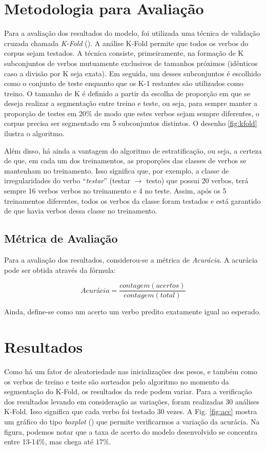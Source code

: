 \section{Metodologia para Avaliação}
\label{sec:method}

 Para a avaliação dos resultados do modelo, foi utilizada uma técnica de validação cruzada chamada \textit{K-Fold} (\cite{kfold:2018}). A análise K-Fold permite que todos os verbos do corpus sejam testados. A técnica consiste, primeiramente, na formação de K subconjuntos de verbos mutuamente exclusivos de tamanhos próximos (idênticos caso a divisão por K seja exata). Em seguida, um desses subconjuntos é escolhido como o conjunto de teste enquanto que os K-1 restantes são utilizados como treino. O tamanho de K é definido a partir da escolha de proporção em que se deseja realizar a segmentação entre treino e teste, ou seja, para sempre manter a proporção de testes em 20\% de modo que estes verbos sejam sempre diferentes, o corpus precisa ser segmentado em 5 subconjuntos distintos. O desenho \ref{fig:kfold} ilustra o algoritmo. 



Além disso, há ainda a vantagem do algoritmo de estratificação, ou seja, a certeza de que, em cada um dos treinamentos, as proporções das classes de verbos se mantenham no treinamento. Isso significa que, por exemplo, a classe de irregularidades do verbo “\textit{testar}” (testar $\rightarrow$ testo) que possui 20 verbos, terá sempre 16 verbos verbos no treinamento e 4 no teste. Assim, após os 5 treinamentos diferentes, todos os verbos da classe foram testados e está garantido de que havia verbos dessa classe no treinamento.

\subsection{Métrica de Avaliação}

Para a avaliação dos resultados, considerou-se a métrica de \textit{Acurácia}. A acurácia pode ser obtida através da fórmula:

\begin{equation}
    Acurácia = \frac{contagem(acertos)}{contagem(total)}
\end{equation}

Ainda, define-se como um acerto um verbo predito exatamente igual ao esperado.

\section{Resultados}
\label{sec:resultado}
Como há um fator de aleatoriedade nas inicializações dos pesos, e também como os verbos de treino e teste são sorteados pelo algoritmo no momento da segmentação do K-Fold, os resultados da rede podem variar. Para a verificação dos resultados levando em consideração as variações, foram realizadas 30 análises K-Fold. Isso significa que cada verbo foi testado 30 vezes. A Fig. \ref{fig:acc} mostra um gráfico do tipo \textit{boxplot} (\cite{2004:bussab}) que permite verificarmos a variação da acurácia. Na figura, podemos notar que a taxa de acerto do modelo desenvolvido se concentra entre 13-14\%, mas chega até 17\%.

